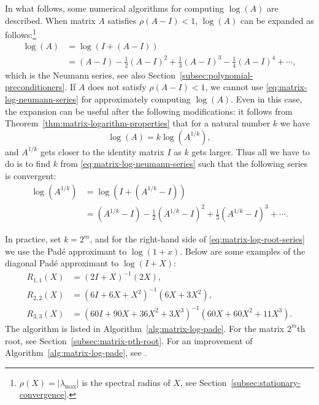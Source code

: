 {In what follows, some numerical algorithms for computing $\log(A)$ are described. When matrix $A$ satisfies $\rho(A-I)<1$, $\log(A)$ can be expanded as follows:}\footnote{{$\rho(X)=|\lambda_{\max}|$ is the spectral radius of $X$, see Section~\ref{subsec:stationary-convergence}.}}
\begin{equation}\label{eq:matrix-log-neumann-series}\begin{aligned}\log(A)&=\log(I+(A-I))\\&=(A-I)-\frac{1}{2}(A-I)^2+\frac{1}{3}(A-I)^3-\frac{1}{4}(A-I)^4+\cdots,\end{aligned}\end{equation}
{which is the Neumann series, see also Section~\ref{subsec:polynomial-preconditioners}. If $A$ does not satisfy $\rho(A-I)<1$, we cannot use \eqref{eq:matrix-log-neumann-series} for approximately computing $\log(A)$. Even in this case, the expansion can be useful after the following modifications: it follows from Theorem~\ref{thm:matrix-logarithm-properties} that for a natural number $k$ we have}
\[\log(A)=k\log(A^{1/k}),\]
{and $A^{1/k}$ gets closer to the identity matrix $I$ as $k$ gets larger. Thus all we have to do is to find $k$ from \eqref{eq:matrix-log-neumann-series} such that the following series is convergent:}
\begin{equation}\label{eq:matrix-log-root-series}\begin{aligned}\log(A^{1/k})&=\log(I+(A^{1/k}-I))\\&=(A^{1/k}-I)-\frac{1}{2}(A^{1/k}-I)^2+\frac{1}{3}(A^{1/k}-I)^3+\cdots.\end{aligned}\end{equation}

{In practice, set $k=2^m$, and for the right-hand side of \eqref{eq:matrix-log-root-series} we use the Padé approximant to $\log(1+x)$. Below are some examples of the diagonal Padé approximant to $\log(I+X)$:}
\[\begin{aligned}R_{1,1}(X)&=(2I+X)^{-1}(2X),\\R_{2,2}(X)&=(6I+6X+X^2)^{-1}(6X+3X^2),\\R_{3,3}(X)&=(60I+90X+36X^2+3X^3)^{-1}(60X+60X^2+11X^3).\end{aligned}\]
{The algorithm is listed in Algorithm~\ref{alg:matrix-log-pade}. For the matrix $2^m$th root, see Section~\ref{subsec:matrix-pth-root}. For an improvement of Algorithm~\ref{alg:matrix-log-pade}, see .}

